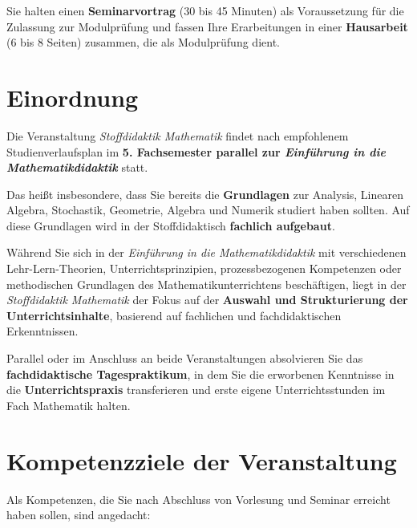 \documentclass[
]{scrbook}
\theoremstyle{definition}
\theoremstyle{definition}
\theoremstyle{definition}
\theoremstyle{definition}
\theoremstyle{remark}
\begin{document}
Sie halten einen \textbf{Seminarvortrag} (30 bis 45 Minuten) als Voraussetzung für die Zulassung zur Modulprüfung und fassen Ihre Erarbeitungen in einer \textbf{Hausarbeit} (6 bis 8 Seiten) zusammen, die als Modulprüfung dient.

\section*{Einordnung}\label{einordnung}

Die Veranstaltung \emph{Stoffdidaktik Mathematik} findet nach empfohlenem Studienverlaufsplan im \textbf{5. Fachsemester parallel zur \emph{Einführung in die Mathematikdidaktik}} statt.

Das heißt insbesondere, dass Sie bereits die \textbf{Grundlagen} zur Analysis, Linearen Algebra, Stochastik, Geometrie, Algebra und Numerik studiert haben sollten. Auf diese Grundlagen wird in der Stoffdidaktisch \textbf{fachlich aufgebaut}.

Während Sie sich in der \emph{Einführung in die Mathematikdidaktik} mit verschiedenen Lehr-Lern-Theorien, Unterrichtsprinzipien, prozessbezogenen Kompetenzen oder methodischen Grundlagen des Mathematikunterrichtens beschäftigen, liegt in der \emph{Stoffdidaktik Mathematik} der Fokus auf der \textbf{Auswahl und Strukturierung der Unterrichtsinhalte}, basierend auf fachlichen und fachdidaktischen Erkenntnissen.

Parallel oder im Anschluss an beide Veranstaltungen absolvieren Sie das \textbf{fachdidaktische Tagespraktikum}, in dem Sie die erworbenen Kenntnisse in die \textbf{Unterrichtspraxis} transferieren und erste eigene Unterrichtsstunden im Fach Mathematik halten.

\section*{Kompetenzziele der Veranstaltung}\label{kompetenzziele-der-veranstaltung}

Als Kompetenzen, die Sie nach Abschluss von Vorlesung und Seminar erreicht haben sollen, sind angedacht:
\end{document}
